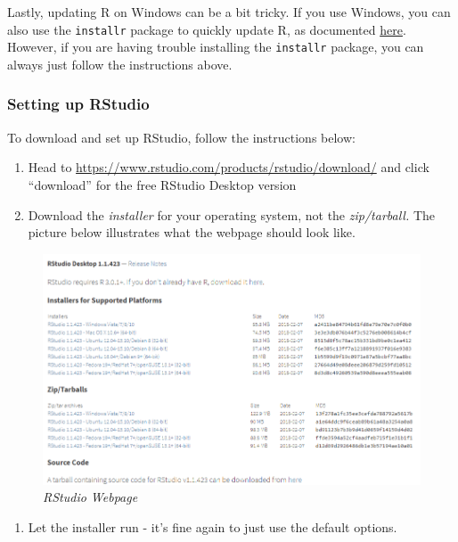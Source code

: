 \documentclass[]{book}
\providecommand{\tightlist}{%
  \setlength{\itemsep}{0pt}\setlength{\parskip}{0pt}}
\begin{document}
Lastly, updating R on Windows can be a bit tricky. If you use Windows,
you can also use the \texttt{installr} package to quickly update R, as
documented
\href{https://www.r-statistics.com/2015/06/a-step-by-step-screenshots-tutorial-for-upgrading-r-on-windows/}{here}.
However, if you are having trouble installing the \texttt{installr}
package, you can always just follow the instructions above.

\subsubsection{Setting up RStudio}\label{setting-up-rstudio}

To download and set up RStudio, follow the instructions below:

\begin{enumerate}
\def\labelenumi{\arabic{enumi}.}
\item
  Head to \url{https://www.rstudio.com/products/rstudio/download/} and
  click ``download'' for the free RStudio Desktop version
\item
  Download the \emph{installer} for your operating system, not the
  \emph{zip/tarball.} The picture below illustrates what the webpage
  should look like.
\end{enumerate}

\begin{figure}
\centering
\includegraphics{./images/rstudio.PNG}
\caption{\emph{RStudio Webpage}}
\end{figure}

\begin{enumerate}
\def\labelenumi{\arabic{enumi}.}
\setcounter{enumi}{2}
\tightlist
\item
  Let the installer run - it's fine again to just use the default
  options.
\end{enumerate}
\end{document}
